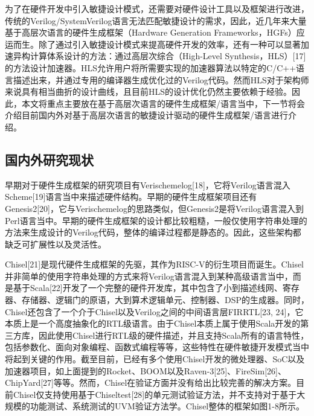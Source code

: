 为了在硬件开发中引入敏捷设计模式，还需要对硬件设计工具以及框架进行改进，传统的Verilog/SystemVerilog语言无法匹配敏捷设计的需求，因此，近几年来大量基于高层次语言的硬件生成框架（Hardware Generation Frameworks，HGFs）应运而生。除了通过引入敏捷设计模式来提高硬件开发的效率，还有一种可以显著加速异构计算体系设计的方法：通过高层次综合（High-Level Synthesis，HLS）[17]的方法设计加速器。HLS允许用户将所需要实现的加速器算法以特定的C/C++语言描述出来，并通过专用的编译器生成优化过的Verilog代码。然而HLS对于架构师来说具有相当曲折的设计曲线，且目前HLS的设计优化仍然主要依赖于经验。因此，本文将重点主要放在基于高层次语言的硬件生成框架/语言当中，下一节将会介绍目前国内外对基于高层次语言的敏捷设计驱动的硬件生成框架/语言进行介绍。

\subsection{国内外研究现状}

早期对于硬件生成框架的研究项目有Verischemelog[18]，它将Verilog语言混入Scheme[19]语言当中来描述硬件结构。早期的硬件生成框架项目还有Genesis2[20]，它与Verischemelog的思路类似，但Genesis2是将Verilog语言混入到Perl语言当中。早期的硬件生成框架的设计都比较粗糙，一般仅使用字符串处理的方法来生成设计的Verilog代码，整体的编译过程都是静态的。因此，这些架构都缺乏可扩展性以及灵活性。

Chisel[21]是现代硬件生成框架的先驱，其作为RISC-V的衍生项目而诞生。Chisel并非简单的使用字符串处理的方式来将Verilog语言混入到某种高级语言当中，而是基于Scala[22]开发了一个完整的硬件开发库，其中包含了小到描述线网、寄存器、存储器、逻辑门的原语，大到算术逻辑单元、控制器、DSP的生成器。同时，Chisel还包含了一个介于Chisel以及Verilog之间的中间语言层FIRRTL[23, 24]，它本质上是一个高度抽象化的RTL级语言。由于Chisel本质上属于使用Scala开发的第三方库，因此使用Chisel进行RTL级的硬件描述，并且支持Scala所有的语言特性，包括参数化、面向对象编程、函数式编程等等，这些特性在硬件敏捷开发模式当中将起到关键的作用。截至目前，已经有多个使用Chisel开发的微处理器、SoC以及加速器项目，如上面提到的Rocket、BOOM以及Raven-3[25]、FireSim[26]、ChipYard[27]等等。然而，Chisel在验证方面并没有给出比较完善的解决方案。目前Chisel仅支持使用基于Chiseltest[28]的单元测试验证方法，并不支持对于基于大规模的功能测试、系统测试的UVM验证方法学。Chisel整体的框架如图1-8所示。

